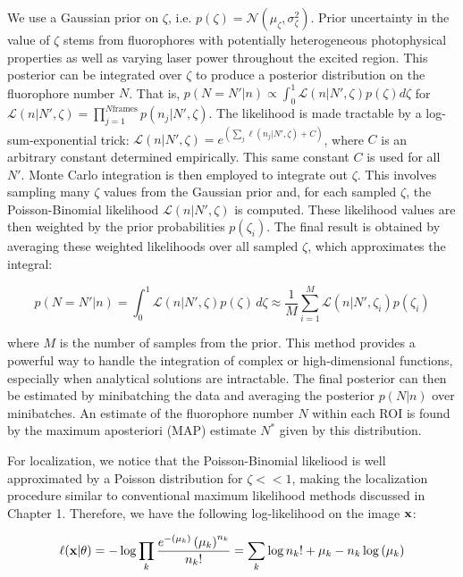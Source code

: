 We use a Gaussian prior on $\zeta$, i.e. $p(\zeta) = \mathcal{N}(\mu_{\zeta},\sigma_{\zeta}^2)$. Prior uncertainty in the value of $\zeta$ stems from fluorophores with potentially heterogeneous photophysical properties as well as varying laser power throughout the excited region. This posterior can be integrated over $\zeta$ to produce a posterior distribution on the fluorophore number $N$. That is, $p(N=N'\lvert n) \propto \int_{0}^{1} \mathcal{L}(n\lvert N',\zeta)p(\zeta) d\zeta$ for $\mathcal{L}(n\lvert N',\zeta)=\prod_{j=1}^{N\mathrm{frames}} p(n_{j}\lvert N',\zeta)$. The likelihood is made tractable by a log-sum-exponential trick: $\mathcal{L}(n\lvert N',\zeta) = e^{\left(\sum_{j}\ell (n_{j}\lvert N',\zeta) + C\right)}$, where $C$ is an arbitrary constant determined empirically. This same constant $C$ is used for all $N'$. Monte Carlo integration is then employed to integrate out $\zeta$. This involves sampling many $\zeta$ values from the Gaussian prior and, for each sampled $\zeta$, the Poisson-Binomial likelihood $\mathcal{L}(n\lvert N',\zeta)$ is computed. These likelihood values are then weighted by the prior probabilities $p(\zeta_i)$. The final result is obtained by averaging these weighted likelihoods over all sampled $\zeta$, which approximates the integral:

\begin{equation}
p(N=N'\lvert n) = \int_{0}^{1} \mathcal{L}(n\lvert N',\zeta) p(\zeta) \, d\zeta \approx \frac{1}{M} \sum_{i=1}^M \mathcal{L}(n\lvert N',\zeta_i) p(\zeta_i)
\end{equation}

where $M$ is the number of samples from the prior. This method provides a powerful way to handle the integration of complex or high-dimensional functions, especially when analytical solutions are intractable. The final posterior can then be estimated by minibatching the data and averaging the posterior $p(N\lvert n)$ over minibatches. An estimate of the fluorophore number $N$ within each ROI is found by the maximum aposteriori (MAP) estimate $N^{*}$ given by this distribution.

For localization, we notice that the Poisson-Binomial likeliood is well approximated by a Poisson distribution for $\zeta << 1$, making the localization procedure similar to conventional maximum likelihood methods discussed in Chapter 1. Therefore, we have the following log-likelihood on the image $\bold{x}$:


\begin{equation}
\ell(\bold{x}\lvert \theta) = -\log \prod_{k} \frac{e^{-\left(\mu_{k}\right)}\left(\mu_{k}\right)^{n_k}}{n_k!}\\
= \sum_{k}  \log n_k! + \mu_{k} - n_k\log\left(\mu_{k}\right)
\end{equation}

